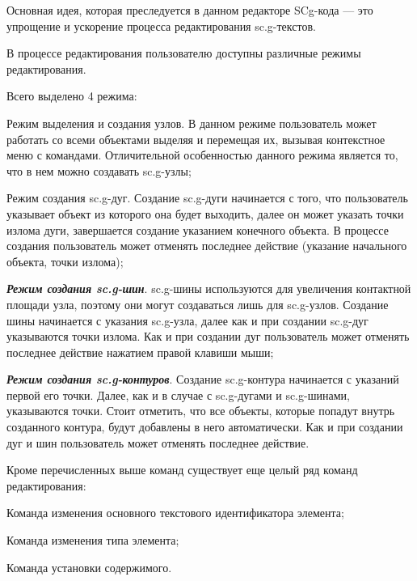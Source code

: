 Основная идея, которая преследуется в данном редакторе SCg-кода --- это упрощение и ускорение процесса редактирования sc.g-текстов.

В процессе редактирования пользователю доступны различные режимы редактирования.

Всего выделено 4 режима:
\begin{textitemize}
\item Режим выделения и создания узлов.
В данном режиме пользователь может работать со всеми объектами выделяя и перемещая их, вызывая контекстное меню с командами.
Отличительной особенностью данного режима является то, что в нем можно создавать sc.g-узлы;

\item Режим создания sc.g-дуг.
Создание sc.g-дуги начинается с того, что пользователь указывает объект из которого она будет выходить, далее он может указать точки излома дуги, завершается создание указанием конечного объекта.
В процессе создания пользователь может отменять последнее действие (указание начального объекта, точки излома);

\item \textbf{\textit{Режим создания sc.g-шин}}.
sc.g-шины используются для увеличения контактной площади узла, поэтому они могут создаваться лишь для sc.g-узлов. 
Создание шины начинается с указания sc.g-узла, далее как и при создании sc.g-дуг указываются точки излома. 
Как и при создании дуг пользователь может отменять последнее действие нажатием правой клавиши мыши;

\item \textbf{\textit{Режим создания sc.g-контуров}}.
Создание sc.g-контура начинается с указаний первой его точки. Далее, как и в случае с sc.g-дугами и sc.g-шинами, указываются точки.
Стоит отметить, что все объекты, которые попадут внутрь созданного
контура, будут добавлены в него автоматически.
Как и при создании дуг и шин пользователь может отменять последнее действие.
\end{textitemize}

Кроме перечисленных выше команд существует еще целый ряд команд редактирования:
\begin{textitemize}
\item Команда изменения основного текстового идентификатора элемента;
\item Команда изменения типа элемента;
\item Команда установки содержимого.
\end{textitemize}

